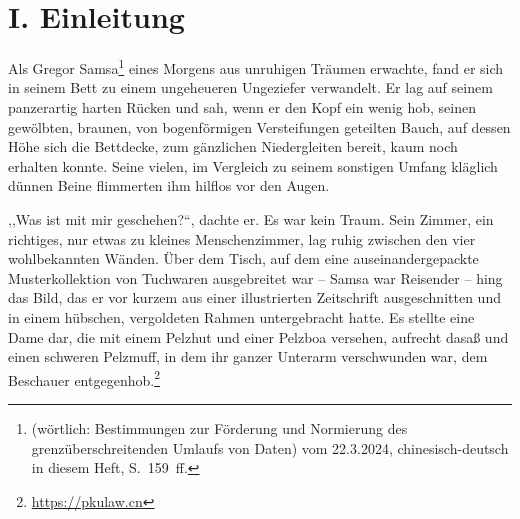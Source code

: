 \documentclass[]{zchinr}
\begin{document}

\zchinrprinttitle

\section{I. Einleitung}

Als Gregor Samsa\footnote{ (wörtlich: Bestimmungen zur Förderung und Normierung des grenzüberschreitenden Umlaufs von Daten) vom 22.3.2024, chinesisch-deutsch in diesem Heft, S.~159~ff.} eines Morgens aus unruhigen Träumen erwachte, fand er sich in seinem Bett zu einem ungeheueren Ungeziefer verwandelt. Er lag auf seinem panzerartig harten Rücken und sah, wenn er den Kopf ein wenig hob, seinen gewölbten, braunen, von bogenförmigen Versteifungen geteilten Bauch, auf dessen Höhe sich die Bettdecke, zum gänzlichen Niedergleiten bereit, kaum noch erhalten konnte. Seine vielen, im Vergleich zu seinem sonstigen Umfang kläglich dünnen Beine flimmerten ihm hilflos vor den Augen.

,,Was ist mit mir geschehen?``, dachte er. Es war kein Traum. Sein Zimmer, ein richtiges, nur etwas zu kleines Menschenzimmer, lag ruhig zwischen den vier wohlbekannten Wänden. Über dem Tisch, auf dem eine auseinandergepackte Musterkollektion von Tuchwaren ausgebreitet war -- Samsa war Reisender -- hing das Bild, das er vor kurzem aus einer illustrierten Zeitschrift ausgeschnitten und in einem hübschen, vergoldeten Rahmen untergebracht hatte. Es stellte eine Dame dar, die mit einem Pelzhut und einer Pelzboa versehen, aufrecht dasaß und einen schweren Pelzmuff, in dem ihr ganzer Unterarm verschwunden war, dem Beschauer entgegenhob.\footnote{\url{https://pkulaw.cn}}



\zchinrprinttitle
\end{document}

